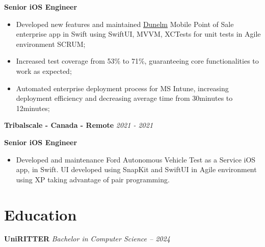 \documentclass[11pt, oneside]{article}
\begin{document}
\textbf{Senior iOS Engineer }

\begin{itemize}
    \item Developed new features and maintained \href{https://www.dunelm.com}{Dunelm} Mobile Point of Sale enterprise app in Swift using SwiftUI, MVVM, XCTests for unit tests in Agile environment SCRUM;
    \item Increased test coverage from 53\% to 71\%, guaranteeing core functionalities to work as expected;
    \item Automated enterprise deployment process for MS Intune, increasing deployment efficiency and decreasing average time from 30minutes to 12minutes;
\end{itemize}

\textbf{Tribalscale - Canada - Remote}
\hfill
\textit{2021 - 2021}

\textbf{Senior iOS Engineer}

\begin{itemize}
    \item Developed and maintenance Ford Autonomous Vehicle Test as a Service iOS app, in Swift. UI developed using SnapKit and SwiftUI in Agile environment using XP taking advantage of pair programming.
\end{itemize}

\section*{Education}
\textbf{UniRITTER}
\hfill
\textit{Bachelor in Computer Science –  2024}
\end{document}
